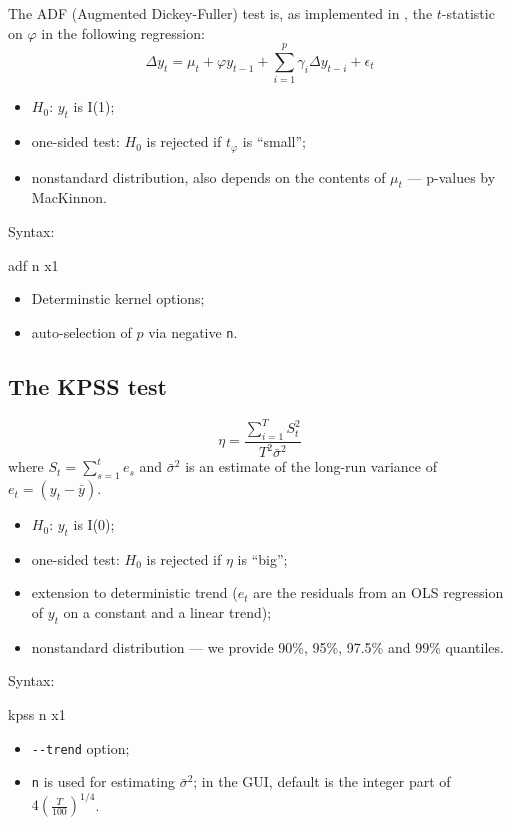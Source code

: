 The ADF (Augmented Dickey-Fuller) test is, as implemented in
, the $t$-statistic on $\varphi$ in the following regression:
\begin{equation}
  \label{eq:ADFtest}
  \Delta y_t = \mu_t + \varphi y_{t-1} + \sum_{i=1}^p \gamma_i \Delta
  y_{t-i} + \epsilon_t
\end{equation}
\begin{itemize}
\item $H_0$: $y_t$ is I(1);
\item one-sided test: $H_0$ is rejected if $t_{\varphi}$ is ``small'';
\item nonstandard distribution, also depends on the contents of
  $\mu_t$ --- p-values by MacKinnon.
\end{itemize}
Syntax:
\begin{code}
  adf n x1
\end{code}
\begin{itemize}
\item Determinstic kernel options;
\item auto-selection of $p$ via negative \verb|n|.
\end{itemize}
\subsection{The KPSS test}
\label{sec:KPSStest}

\begin{equation}
  \label{eq:KPSStest}
  \eta = \frac{\sum_{i=1}^T S_t^2 }{ T^2 \bar{\sigma}^2 }
\end{equation}
where $S_t = \sum_{s=1}^t e_s$ and $\bar{\sigma}^2$ is an
estimate of the long-run variance of $e_t = (y_t - \bar{y})$.
\begin{itemize}
\item $H_0$: $y_t$ is I(0);
\item one-sided test: $H_0$ is rejected if $\eta$ is ``big'';
\item extension to deterministic trend ($e_t$ are the residuals from
  an OLS regression of $y_t$ on a constant and a linear trend);
\item nonstandard distribution --- we provide 90\%, 95\%, 97.5\% and
  99\% quantiles.
\end{itemize}
Syntax:
\begin{code}
  kpss n x1
\end{code}
\begin{itemize}
\item \verb|--trend| option;
\item \verb|n| is used for estimating $\bar{\sigma}^2$; in the GUI,
  default is the integer part of $4 \left( \frac{T}{100}
  \right)^{1/4}$.
\end{itemize}


